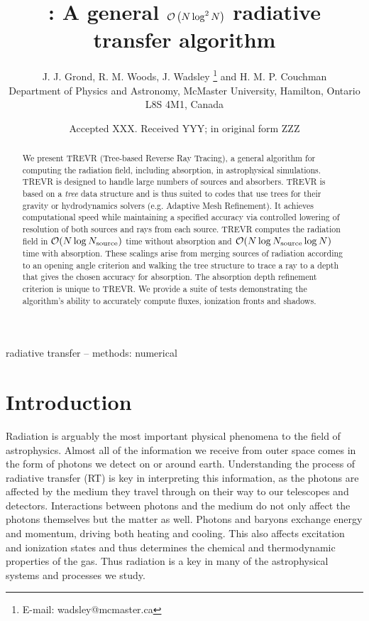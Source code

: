\documentclass[fleq,usenatbib]{mnras}
\title[]{\acro{}: A general $\mathcal{O}\left(N\log^2N\right)$ radiative transfer algorithm}
\author[J. J. Grond et al.]{
J. J. Grond,
R. M. Woods,
J. Wadsley \thanks{E-mail:  wadsley@mcmaster.ca}
and H. M. P. Couchman
\\
Department of Physics and Astronomy, McMaster University, Hamilton, Ontario L8S
 4M1, Canada}
\date{Accepted XXX. Received YYY; in original form ZZZ}
\newcommand{\acro}{TREVR}
\newcommand{\NS}{N_{\rm source}}
\begin{document}
\label{firstpage}
\pagerange{\pageref{firstpage}--\pageref{lastpage}}
\maketitle

\begin{abstract}
We present \acro{} (Tree-based Reverse Ray Tracing), a general algorithm for 
computing the radiation field, including absorption, in astrophysical simulations. \acro{} 
is designed to handle large numbers of sources and absorbers.
\acro{} is based on a \emph{tree} data structure and is thus suited to codes
that use trees for their gravity or hydrodynamics solvers (e.g. Adaptive Mesh Refinement).
It achieves computational speed
while maintaining a specified accuracy via controlled lowering of resolution of both sources and rays from each source.
\acro{} computes the
radiation field in $\mathcal{O}(N \log \NS)$ time without absorption and 
$\mathcal{O}(N \log \NS \log{N})$ time with absorption.  These scalings arise from
merging sources of radiation according to an opening angle 
criterion and walking the tree structure to trace a ray to a depth that gives the chosen
accuracy for absorption.  The absorption depth refinement criterion is unique to \acro{}.
We provide a suite of tests demonstrating the algorithm's ability to accurately 
compute fluxes, ionization fronts and shadows.   

\end{abstract}

\begin{keywords}
radiative transfer -- methods: numerical
\end{keywords}



\section{Introduction}\label{sec:intr}
Radiation is arguably the most important physical phenomena to the field of
astrophysics. Almost all of the information we receive from outer space comes 
in the form of photons we detect on or around earth. Understanding the process 
of radiative transfer (RT) is key in interpreting this information, as the 
photons are affected by the medium they travel through on their way to our 
telescopes and detectors. Interactions between photons and the medium do not 
only affect the photons themselves but the matter as well. Photons and baryons 
exchange energy and momentum, driving both heating and cooling.
This also affects excitation and ionization states 
and thus determines the chemical and thermodynamic properties of 
the gas.  Thus radiation is a key in many of the 
astrophysical systems and processes we study.
\end{document}
